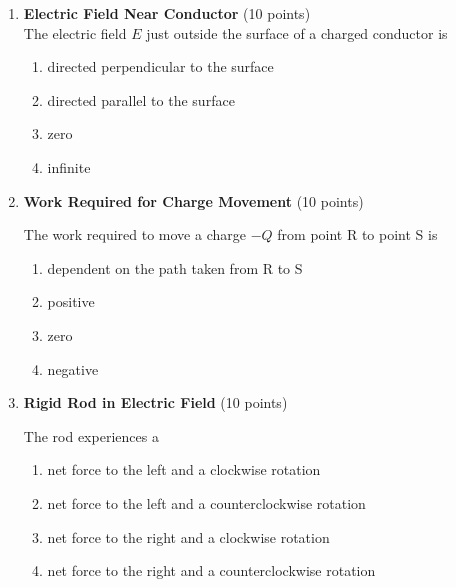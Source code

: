 \begin{enumerate}
  \item \textbf{Electric Field Near Conductor} (10 points)\\
  The electric field $E$ just outside the surface of a charged conductor is
  \begin{enumerate}[label=(\Alph*)]
    \item directed perpendicular to the surface
    \item directed parallel to the surface
    \item zero
    \item infinite
  \end{enumerate}
  \begin{subanswer}
  \end{subanswer}

  \item \textbf{Work Required for Charge Movement} (10 points)\\
  
  The work required to move a charge $-Q$ from point R to point S is
  \begin{enumerate}[label=(\Alph*)]
    \item dependent on the path taken from R to S
    \item positive
    \item zero
    \item negative
  \end{enumerate}
  \begin{subanswer}
  \end{subanswer}

  \item \textbf{Rigid Rod in Electric Field} (10 points)\\
  
  The rod experiences a
  \begin{enumerate}[label=(\Alph*)]
    \item net force to the left and a clockwise rotation
    \item net force to the left and a counterclockwise rotation
    \item net force to the right and a clockwise rotation
    \item net force to the right and a counterclockwise rotation
  \end{enumerate}
  \begin{subanswer}
  \end{subanswer}


\end{enumerate}

